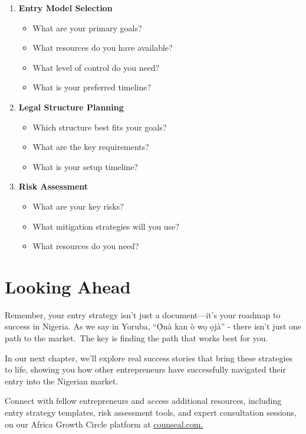 \begin{enumerate}
    \item \textbf{Entry Model Selection}
    \begin{itemize}
        \item What are your primary goals?
        \item What resources do you have available?
        \item What level of control do you need?
        \item What is your preferred timeline?
    \end{itemize}
    \item \textbf{Legal Structure Planning}
    \begin{itemize}
        \item Which structure best fits your goals?
        \item What are the key requirements?
        \item What is your setup timeline?
    \end{itemize}
    \item \textbf{Risk Assessment}
    \begin{itemize}
        \item What are your key risks?
        \item What mitigation strategies will you use?
        \item What resources do you need?
    \end{itemize}
\end{enumerate}

\section{Looking Ahead}\label{sec:looking-ahead-next}

Remember, your entry strategy isn't just a document—it's your roadmap to success in Nigeria.
As we say in Yoruba, ``Ọ̀nà kan ò wọ ọjà'' - there isn't just one path to the market.\ The key is finding the path that works best for you.

In our next chapter, we'll explore real success stories that bring these strategies to life, showing you how other entrepreneurs have successfully navigated their entry into the Nigerian market.

Connect with fellow entrepreneurs and access additional resources, including entry strategy templates, risk assessment tools, and expert consultation sessions, on our Africa Growth Circle platform at \href{https://viz.li/csl-book-ngbiz}{counseal.com.}

